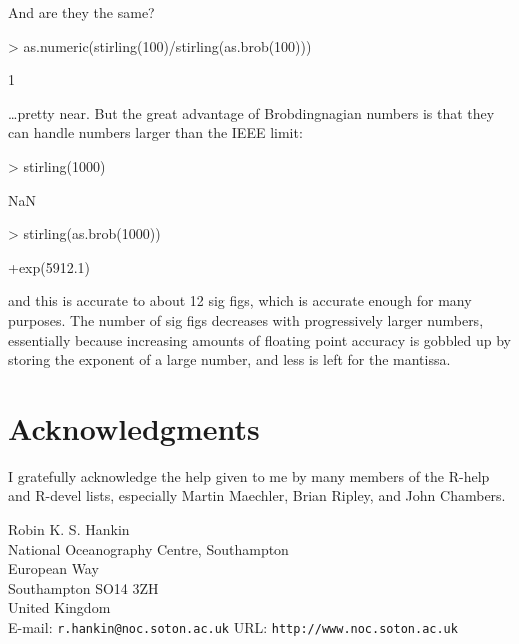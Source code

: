 \documentclass[a4paper]{article}
\begin{document}
And are they the same?

\begin{Schunk}
\begin{Sinput}
> as.numeric(stirling(100)/stirling(as.brob(100)))
\end{Sinput}
\begin{Soutput}
[1] 1
\end{Soutput}
\end{Schunk}

\ldots pretty near.  But the great advantage of Brobdingnagian numbers
is that they can handle numbers larger than the IEEE limit:

\begin{Schunk}
\begin{Sinput}
> stirling(1000)
\end{Sinput}
\begin{Soutput}
[1] NaN
\end{Soutput}
\begin{Sinput}
> stirling(as.brob(1000))
\end{Sinput}
\begin{Soutput}
[1] +exp(5912.1)
\end{Soutput}
\end{Schunk}

\noindent
and this is accurate to about 12 sig figs, which is accurate enough
for many purposes.  The number of sig figs decreases with
progressively larger numbers, essentially because increasing amounts
of floating point accuracy is gobbled up by storing the exponent of a
large number, and less is left for the mantissa.


\section*{Acknowledgments}

I gratefully acknowledge the help given to me by many members of the
R-help and R-devel lists, especially Martin Maechler, Brian Ripley,
and John Chambers.

\newpage

  \noindent
  Robin K. S. Hankin\\
  National Oceanography Centre, Southampton\\
  European Way\\
  Southampton SO14 3ZH\\
  United Kingdom\\
  E-mail: {\tt r.hankin@noc.soton.ac.uk}
  URL: {\tt http://www.noc.soton.ac.uk}
\end{document}
